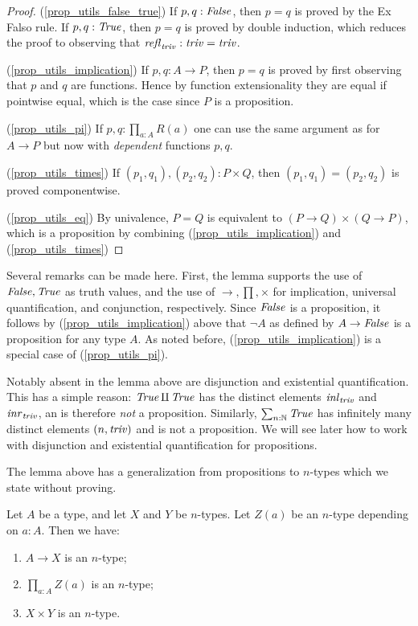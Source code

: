 \begin{proof}
(\ref{prop_utils_false_true})
If $p,q : \mathop{\mathit{False}}$, then $p=q$ is proved by the Ex Falso rule.
If $p,q : \mathop{\mathit{True}}$, then $p=q$ is proved by double induction,
which reduces the proof to observing that $\mathop{{\it refl}_{\mathop{\mathit{triv}}}}: \mathop{\mathit{triv}}=\mathop{\mathit{triv}}$.

(\ref{prop_utils_implication})
If $p,q : A\to P$, then $p=q$ is proved by first observing that $p$ and $q$
are functions. Hence by function extensionality they are equal if pointwise
equal, which is the case since $P$ is a proposition.

(\ref{prop_utils_pi})
If $p,q : \prod_{a:A} R(a)$ one can use the same argument as for $A\to P$
but now with \emph{dependent} functions $p,q$.

(\ref{prop_utils_times})
If $(p_1,q_1),(p_2,q_2) : P\times Q$, then $(p_1,q_1)=(p_2,q_2)$
is proved componentwise. 

(\ref{prop_utils_eq})
By univalence, $P = Q$ is equivalent to
$(P\to Q)\times(Q\to P)$, which is a proposition by 
combining (\ref{prop_utils_implication}) and
(\ref{prop_utils_times})
\end{proof}

Several remarks can be made here. First, the lemma supports the
use of $\mathop{\mathit{False}},\mathop{\mathit{True}}$ as truth values, and the use of
$\to,\prod,\times$ for implication, universal quantification,
and conjunction, respectively. Since $\mathop{\mathit{False}}$ is a proposition,
it follows by (\ref{prop_utils_implication}) above that
$\neg A$ as defined by $A\to\mathop{\mathit{False}}$ is a proposition for any type $A$.
As noted before, (\ref{prop_utils_implication}) is a
special case of (\ref{prop_utils_pi}).

Notably absent in the lemma above are disjunction
and existential quantification. This has a simple reason:
$\mathop{\mathit{True}}\amalg \mathop{\mathit{True}}$ has the distinct elements
$\mathop{{\it inl}_{\mathop{\mathit{triv}}}}$ and $\mathop{{\it inr}_{\mathop{\mathit{triv}}}}$, an is therefore \emph{not} a proposition.
Similarly, $\sum_{n:\mathbb{N}} \mathop{\mathit{True}}$ has infinitely many
distinct elements $(n,\mathop{\mathit{triv}})$ and is not a proposition. We will see later how
to work with disjunction and existential quantification for propositions.

The lemma above has a generalization from propositions to
$n$-types which we state without proving.

\begin{lemma}\label{lem:level_n_utils}
Let $A$ be a type, and let $X$ and $Y$ be $n$-types.
Let $Z(a)$ be an $n$-type depending on $a:A$. Then we have:
\begin{enumerate}
\item\label{level_n_utils_implication} $A\to X$ is an $n$-type;
\item\label{level_n_utils_pi} $\prod_{a:A} Z(a)$ is an $n$-type;
\item\label{level_n_utils_times} $X\times Y$ is an $n$-type.
\end{enumerate}
\end{lemma}


